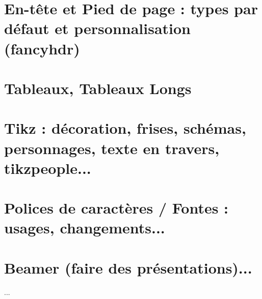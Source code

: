 \documentclass[11pt,twoside,a4paper]{article}
\begin{document}
\begin{landscape}
\begin{multicols}{2}
	\section{En-tête et Pied de page : types par défaut et personnalisation (fancyhdr)} 
	\section{Tableaux, Tableaux Longs} 
	\section{Tikz : décoration, frises, schémas, personnages, texte en travers, tikzpeople...}  
	\section{Polices de caractères / Fontes : usages, changements...} 
	\section{Beamer (faire des présentations)...}
	
	...
\end{multicols}

\clearpage

\end{landscape}
\end{document}
